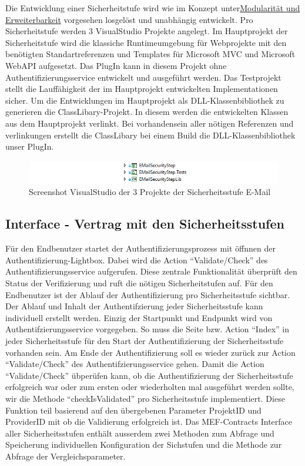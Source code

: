 Die Entwicklung einer Sicherheitstufe wird wie im Konzept
unter\protect\hyperlink{modularituxe4t-und-erweiterbarkeit}{Modularität
und Erweiterbarkeit} vorgesehen losgelöst und unabhängig entwickelt. Pro
Sicherheitstufe werden 3 VisualStudio Projekte angelegt. Im Hauptprojekt
der Sicherheitstufe wird die klassiche Runtimeumgebung für Webprojekte
mit den benötigten Standartreferenzen und Templates für Microsoft MVC
und Microsoft WebAPI aufgesetzt. Das PlugIn kann in diesem Projekt ohne
Authentifizierungsservice entwickelt und ausgeführt werden. Das
Testprojekt stellt die Lauffähigkeit der im Hauptprojekt entwickelten
Implementationen sicher. Um die Entwicklungen im Hauptprojekt als
DLL-Klassenbibliothek zu generieren die ClassLibary-Projekt. In diesem
werden die entwickelten Klassen aus dem Hauptprojekt verlinkt. Bei
vorhandensein aller nötigen Referenzen und verlinkungen erstellt die
ClassLibary bei einem Build die DLL-Klassenbibliothek unser PlugIn.

\begin{figure}[htbp]
\centering
\includegraphics{images/visualstudio_securitystep.png}
\caption{Screenshot VisualStudio der 3 Projekte der Sicherheitsstufe
E-Mail}
\end{figure}

\subsection{Interface - Vertrag mit den
Sicherheitsstufen}\label{interface---vertrag-mit-den-sicherheitsstufen}

Für den Endbenutzer startet der Authentifizierungsprozess mit öffnnen
der Authentifizierung-Lightbox. Dabei wird die Action ``Validate/Check''
des Authentifizierungsservice aufgerufen. Diese zentrale Funktionalität
überprüft den Status der Verifizierung und ruft die nötigen
Sicherheitstufen auf. Für den Endbenutzer ist der Ablauf der
Authentifizierung pro Sicherheitsstufe sichtbar. Der Ablauf und Inhalt
der Authentifzierung jeder Sicherheitsstufe kann individuell erstellt
werden. Einzig der Startpunkt und Endpunkt wird von
Authentifzierungsservice vorgegeben. So muss die Seite bzw. Action
``Index'' in jeder Sicherheitsstufe für den Start der Authentifizierung
der Sicherheitsstufe vorhanden sein. Am Ende der Authentifizierung soll
es wieder zurück zur Action ``Validate/Check'' des
Authentifzierungsservice gehen. Damit die Action ``Validate/Check''
übperüfen kann, ob die Authentifizierung der Sicherheitsstufe
erfolgreich war oder zum ersten oder wiederholten mal ausgeführt werden
sollte, wir die Methode ``checkIsValidated'' pro Sicherheitsstufe
implementiert. Diese Funktion teil basierend auf den übergebenen
Parameter ProjektID und ProviderID mit ob die Validierung erfolgreich
ist. Das MEF-Contracts Interface aller Sicherheitsstufen enthält
ausserdem zwei Methoden zum Abfrage und Speicherung individuellen
Konfiguration der Sichstufen und die Methode zur Abfrage der
Vergleichsparameter.

